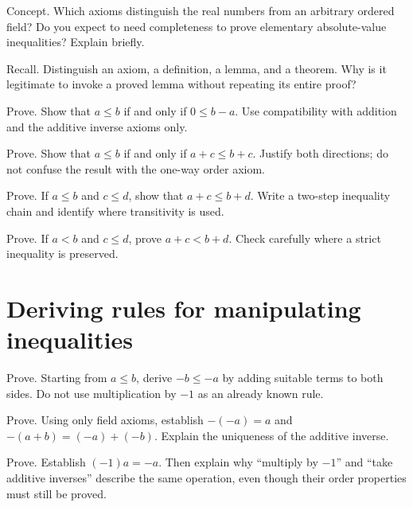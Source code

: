 \documentclass{workbook}
\begin{document}
\begin{problem}{Concept.}
Which axioms distinguish the real numbers from an arbitrary ordered field?
Do you expect to need completeness to prove elementary absolute-value
inequalities? Explain briefly.
\end{problem}

\begin{problem}{Recall.}
Distinguish an axiom, a definition, a lemma, and a theorem. Why is it
legitimate to invoke a proved lemma without repeating its entire proof?
\end{problem}

\begin{problem}{Prove.}
Show that $a\leq b$ if and only if $0\leq b-a$. Use compatibility with
addition and the additive inverse axioms only.
\end{problem}

\begin{problem}{Prove.}
Show that $a\leq b$ if and only if $a+c\leq b+c$. Justify both directions;
do not confuse the result with the one-way order axiom.
\end{problem}

\begin{problem}{Prove.}
If $a\leq b$ and $c\leq d$, show that $a+c\leq b+d$. Write a two-step
inequality chain and identify where transitivity is used.
\end{problem}

\begin{problem}{Prove.}
If $a<b$ and $c\leq d$, prove $a+c<b+d$. Check carefully where a strict
inequality is preserved.
\end{problem}

\section{Deriving rules for manipulating inequalities}

\begin{problem}{Prove.}
Starting from $a\leq b$, derive $-b\leq -a$ by adding suitable terms to
both sides. Do not use multiplication by $-1$ as an already known rule.
\end{problem}

\begin{problem}{Prove.}
Using only field axioms, establish $-(-a)=a$ and
$-(a+b)=(-a)+(-b)$. Explain the uniqueness of the additive inverse.
\end{problem}

\begin{problem}{Prove.}
Establish $(-1)a=-a$. Then explain why ``multiply by $-1$'' and ``take
additive inverses'' describe the same operation, even though their order
properties must still be proved.
\end{problem}
\end{document}
